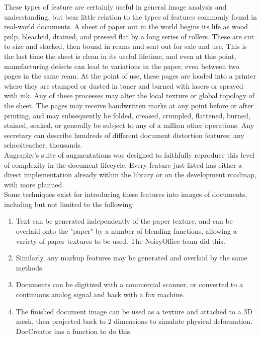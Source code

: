 \documentclass[runningheads]{article}
\begin{document}
These types of feature are certainly useful in general image analysis and understanding, but bear little relation to the types of features commonly found in real-world documents. A sheet of paper out in the world begins its life as wood pulp, bleached, drained, and pressed flat by a long series of rollers. These are cut to size and stacked, then bound in reams and sent out for sale and use. This is the last time the sheet is clean in its useful lifetime, and even at this point, manufacturing defects can lead to variations in the paper, even between two pages in the same ream. At the point of use, these pages are loaded into a printer where they are stamped or dusted in toner and burned with lasers or sprayed with ink. Any of these processes may alter the local texture or global topology of the sheet. The pages may receive handwritten marks at any point before or after printing, and may subsequently be folded, creased, crumpled, flattened, burned, stained, soaked, or generally be subject to any of a million other operations. Any secretary can describe hundreds of different document distortion features; any schoolteacher, thousands.\\

Augraphy's suite of augmentations was designed to faithfully reproduce this level of complexity in the document lifecycle. Every feature just listed has either a direct implementation already within the library or on the development roadmap, with more planned.\\

Some techniques exist for introducing these features into images of documents, including but not limited to the following:\\
\begin{enumerate}
\item Text can be generated independently of the paper texture, and can be overlaid onto the "paper" by a number of blending functions, allowing a variety of paper textures to be used. The NoisyOffice team did this.
\item Similarly, any markup features may be generated and overlaid by the same methods.
\item Documents can be digitized with a commercial scanner, or converted to a continuous analog signal and back with a fax machine.
\item The finished document image can be used as a texture and attached to a 3D mesh, then projected back to 2 dimensions to simulate physical deformation. DocCreator has a function to do this.
\end{enumerate}
\end{document}
